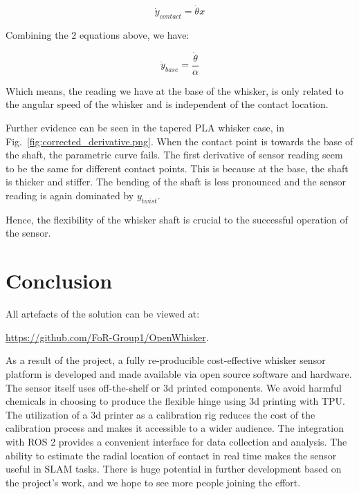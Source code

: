 \documentclass[runningheads]{llncs}
\begin{document}
    \[\dot{y}_{contact} = \dot{\theta}x\]

Combining the 2 equations above, we have:

    \[\dot{y}_{base} = \frac{\dot{\theta}}{\alpha} \]

Which means, the reading we have at the base of the whisker, is only related to the angular speed of the whisker and is independent of the contact location.

Further evidence can be seen in the tapered PLA whisker case, in Fig.~\ref*{fig:corrected_derivative.png}. When the contact point is towards the base of the shaft, the parametric curve fails. The first derivative of sensor reading seem to be the same for different contact points. This is because at the base, the shaft is thicker and stiffer. The bending of the shaft is less pronounced and the sensor reading is again dominated by \({y}_{twist}\).

Hence, the flexibility of the whisker shaft is crucial to the successful operation of the sensor.


\section{Conclusion}

All artefacts of the solution can be viewed at:

\url{https://github.com/FoR-Group1/OpenWhisker}.


As a result of the project, a fully re-producible cost-effective whisker sensor platform is developed and made available via open source software and hardware. The sensor itself uses off-the-shelf or 3d printed components. We avoid harmful chemicals in choosing to produce the flexible hinge using 3d printing with TPU. The utilization of a 3d printer as a calibration rig reduces the cost of the calibration process and makes it accessible to a wider audience. The integration with ROS 2 provides a convenient interface for data collection and analysis. The ability to estimate the radial location of contact in real time makes the sensor useful in SLAM tasks. There is huge potential in further development based on the project's work, and we hope to see more people joining the effort.


\end{document}

